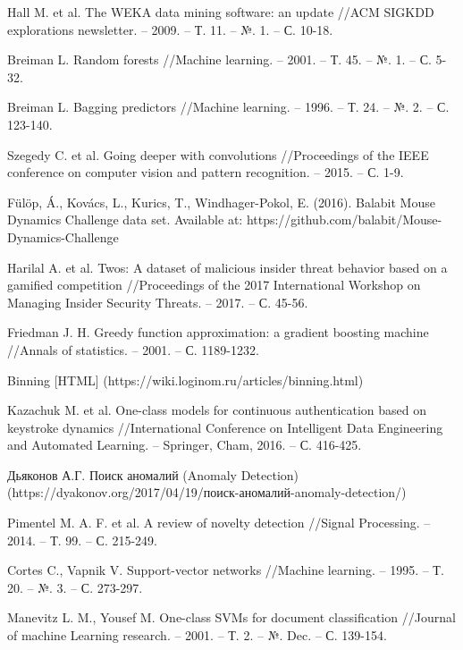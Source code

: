 \documentclass[12pt]{article}
\begin{document}
\begin{thebibliography}{20}
        Hall M. et al. The WEKA data mining software: an update //ACM SIGKDD explorations newsletter. – 2009. – Т. 11. – №. 1. – С. 10-18.

        Breiman L. Random forests //Machine learning. – 2001. – Т. 45. – №. 1. – С. 5-32.

        Breiman L. Bagging predictors //Machine learning. – 1996. – Т. 24. – №. 2. – С. 123-140.

        Szegedy C. et al. Going deeper with convolutions //Proceedings of the IEEE conference on computer vision and pattern recognition. – 2015. – С. 1-9.

        Fülöp, Á., Kovács, L., Kurics, T., Windhager-Pokol, E. (2016). Balabit Mouse Dynamics Challenge data set. Available at: https://github.com/balabit/Mouse-Dynamics-Challenge

        Harilal A. et al. Twos: A dataset of malicious insider threat behavior based on a gamified competition //Proceedings of the 2017 International Workshop on Managing Insider Security Threats. – 2017. – С. 45-56.

        Friedman J. H. Greedy function approximation: a gradient boosting machine //Annals of statistics. – 2001. – С. 1189-1232.

        Binning [HTML] (https://wiki.loginom.ru/articles/binning.html)

        Kazachuk M. et al. One-class models for continuous authentication based on keystroke dynamics //International Conference on Intelligent Data Engineering and Automated Learning. – Springer, Cham, 2016. – С. 416-425.

        Дьяконов А.Г. Поиск аномалий (Anomaly Detection) (https://dyakonov.org/2017/04/19/поиск-аномалий-anomaly-detection/)

        Pimentel M. A. F. et al. A review of novelty detection //Signal Processing. – 2014. – Т. 99. – С. 215-249.

        Cortes C., Vapnik V. Support-vector networks //Machine learning. – 1995. – Т. 20. – №. 3. – С. 273-297.

        Manevitz L. M., Yousef M. One-class SVMs for document classification //Journal of machine Learning research. – 2001. – Т. 2. – №. Dec. – С. 139-154.


\end{thebibliography}
\end{document}
